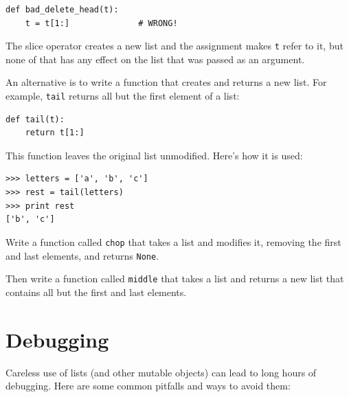 \documentclass[10pt]{book}
\begin{document}
\beforeverb
\begin{verbatim}
def bad_delete_head(t):
    t = t[1:]              # WRONG!
\end{verbatim}
\afterverb

The slice operator creates a new list and the assignment
makes {\tt t} refer to it, but none of that has any effect
on the list that was passed as an argument.


An alternative is to write a function that creates and
returns a new list.  For
example, {\tt tail} returns all but the first
element of a list:

\beforeverb
\begin{verbatim}
def tail(t):
    return t[1:]
\end{verbatim}
\afterverb
%
This function leaves the original list unmodified.
Here's how it is used:

\beforeverb
\begin{verbatim}
>>> letters = ['a', 'b', 'c']
>>> rest = tail(letters)
>>> print rest
['b', 'c']
\end{verbatim}
\afterverb


\begin{ex}

Write a function called {\tt chop} that takes a list and modifies
it, removing the first and last elements, and returns {\tt None}.

Then write a function called {\tt middle} that takes a list and
returns a new list that contains all but the first and last
elements.

\end{ex}


\section{Debugging}

Careless use of lists (and other mutable objects)
can lead to long hours of debugging.  Here are some common
pitfalls and ways to avoid them:
\end{document}
